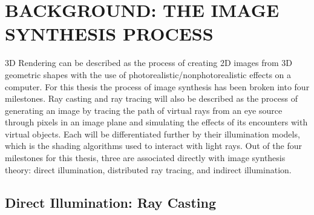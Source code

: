 %
%
%



\pagestyle{plain} %
\setcounter{page}{1}


\chapter{\uppercase {Background: The Image Synthesis Process}}

3D Rendering can be described as the process of creating 2D images from 3D geometric shapes with the use of photorealistic/nonphotorealistic effects on a computer. For this thesis the process of image synthesis has been broken into four milestones.  Ray casting and ray tracing will also be described as the process of generating an image by tracing the path of virtual rays from an eye source through pixels in an image plane and simulating the effects of its encounters with virtual objects.  Each will be differentiated further by their illumination models, which is the shading algorithms used to interact with light rays. Out of the four milestones for this thesis, three are associated directly with image synthesis theory: direct illumination, distributed ray tracing, and indirect illumination.

\section{Direct Illumination: Ray Casting}

